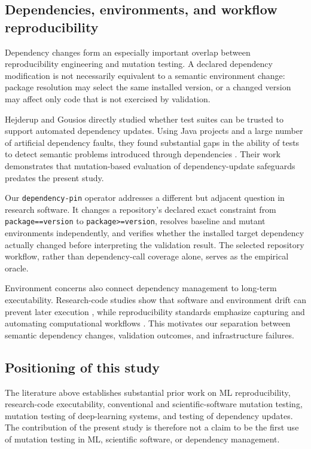 \subsection{Dependencies, environments, and workflow reproducibility}
\label{sec:related-environments}

Dependency changes form an especially important overlap between reproducibility
engineering and mutation testing. A declared dependency modification is not
necessarily equivalent to a semantic environment change: package resolution
may select the same installed version, or a changed version may affect only
code that is not exercised by validation.

Hejderup and Gousios directly studied whether test suites can be trusted to
support automated dependency updates. Using Java projects and a large number of
artificial dependency faults, they found substantial gaps in the ability of
tests to detect semantic problems introduced through dependencies
\cite{hejderup2022dependencies}. Their work demonstrates that mutation-based
evaluation of dependency-update safeguards predates the present study.

Our \texttt{dependency-pin} operator addresses a different but adjacent
question in research software. It changes a repository's declared exact
constraint from \texttt{package==version} to
\texttt{package>=version}, resolves baseline and mutant environments
independently, and verifies whether the installed target dependency actually
changed before interpreting the validation result. The selected repository
workflow, rather than dependency-call coverage alone, serves as the empirical
oracle.

Environment concerns also connect dependency management to long-term
executability. Research-code studies show that software and environment drift
can prevent later execution \cite{trisovic2022execution}, while reproducibility
standards emphasize capturing and automating computational workflows
\cite{heil2021standards}. This motivates our separation between semantic
dependency changes, validation outcomes, and infrastructure failures.


\subsection{Positioning of this study}
\label{sec:related-positioning}

The literature above establishes substantial prior work on ML reproducibility,
research-code executability, conventional and scientific-software mutation
testing, mutation testing of deep-learning systems, and testing of dependency
updates. The contribution of the present study is therefore not a claim to be
the first use of mutation testing in ML, scientific software, or dependency
management.

